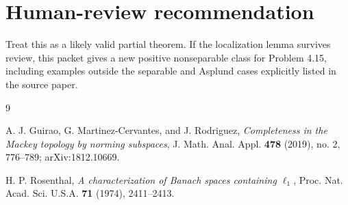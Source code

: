 \documentclass[11pt]{article}
\begin{document}
\section*{Human-review recommendation}

Treat this as a likely valid partial theorem.  If the localization lemma
survives review, this packet gives a new positive nonseparable class for
Problem 4.15, including examples outside the separable and Asplund cases
explicitly listed in the source paper.

\begin{thebibliography}{9}

A. J. Guirao, G. Martinez-Cervantes, and J. Rodriguez,
\emph{Completeness in the Mackey topology by norming subspaces},
J. Math. Anal. Appl. \textbf{478} (2019), no. 2, 776--789;
arXiv:1812.10669.

H. P. Rosenthal,
\emph{A characterization of Banach spaces containing $\ell_1$},
Proc. Nat. Acad. Sci. U.S.A. \textbf{71} (1974), 2411--2413.

\end{thebibliography}
\end{document}
